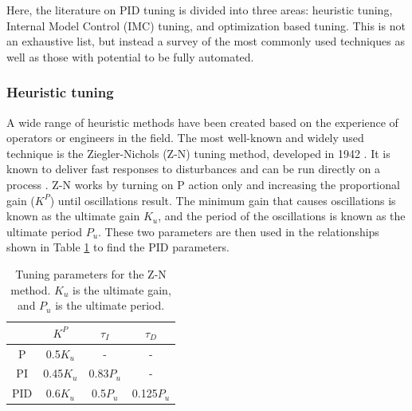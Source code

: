 Here, the literature on PID tuning is divided into three areas: heuristic tuning, Internal Model Control (IMC) tuning, and optimization based tuning. This is not an exhaustive list, but instead a survey of the most commonly used techniques as well as those with potential to be fully automated.  

\subsubsection{Heuristic tuning}
A wide range of heuristic methods have been created based on the experience of operators or engineers in the field. The most well-known and widely used technique is the Ziegler-Nichols (Z-N) tuning method, developed in 1942 \cite{Ziegler1942}. It is known to deliver fast responses to disturbances and can be run directly on a process \cite{Riggs2006}. Z-N works by turning on P action only and increasing the proportional gain ($K^P$) until oscillations result. The minimum gain that causes oscillations is known as the ultimate gain $K_u$, and the period of the oscillations is known as the ultimate period $P_u$. These two parameters are then used in the relationships shown in Table \ref{table:ZN_parameters} to find the PID parameters.

\begin{table}[b]
	\centering
	\caption{Tuning parameters for the Z-N method. $K_u$ is the ultimate gain, and $P_u$ is the ultimate period.}
	\label{table:ZN_parameters}
	\begin{tabular}{ c c c c }
	& $K^P$ & $\tau_I$ & $\tau_D$ \\
	\hline
	P & 0.5$K_u$ & - & - \\
	PI & 0.45$K_u$ & 0.83$P_u$ & - \\
	PID & 0.6$K_u$ & 0.5$P_u$ & 0.125$P_u$ \\
	\end{tabular}
\end{table}

